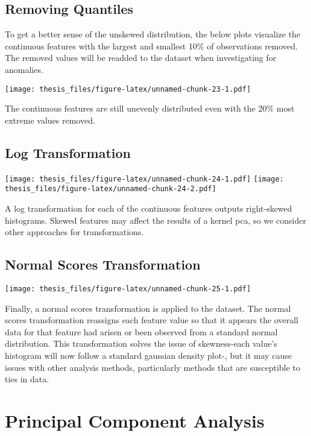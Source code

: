 \documentclass[12pt,twoside]{dukestatscithesis}
\theoremstyle{definition}
\theoremstyle{definition}
\theoremstyle{definition}
\theoremstyle{remark}
\begin{document}
\subsection{Removing Quantiles}\label{removing-quantiles}

To get a better sense of the unskewed distribution, the below plots
visualize the continuous features with the largest and smallest 10\% of
observations removed. The removed values will be readded to the dataset
when investigating for anomalies.

\texttt{[image: thesis\_files/figure-latex/unnamed-chunk-23-1.pdf]}

The continuous features are still unevenly distributed even with the
20\% most extreme values removed.

\subsection{Log Transformation}\label{log-transformation}

\texttt{[image: thesis\_files/figure-latex/unnamed-chunk-24-1.pdf]}
\texttt{[image: thesis\_files/figure-latex/unnamed-chunk-24-2.pdf]}

A log transformation for each of the continuous features outputs
right-skewed histograms. Skewed features may affect the results of a
kernel pca, so we consider other approaches for transformations.

\subsection{Normal Scores
Transformation}\label{normal-scores-transformation}

\texttt{[image: thesis\_files/figure-latex/unnamed-chunk-25-1.pdf]}

Finally, a normal scores transformation is applied to the dataset. The
normal scores transformation reassigns each feature value so that it
appears the overall data for that feature had arisen or been observed
from a standard normal distribution. This transformation solves the
issue of skewness-each value's histogram will now follow a standard
gaussian density plot-, but it may cause issues with other analysis
methods, particularly methods that are susceptible to ties in data.

\section{Principal Component
Analysis}\label{principal-component-analysis}
\end{document}
